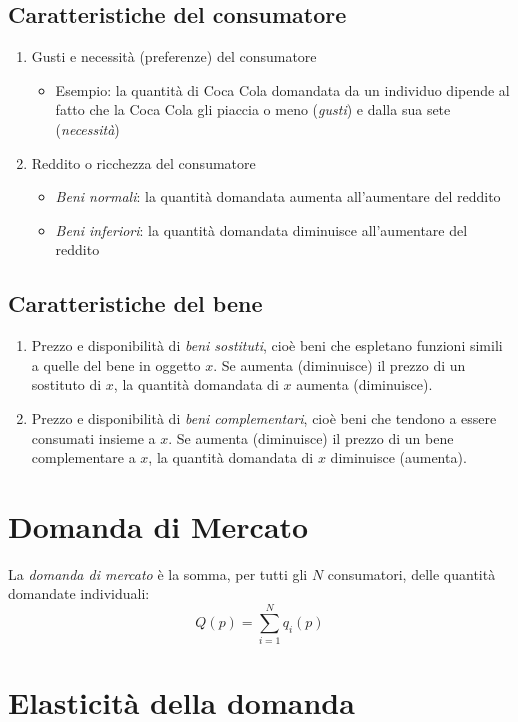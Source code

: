 \subsection{Caratteristiche del consumatore}
\begin{enumerate}
	\item Gusti e necessità (preferenze) del consumatore
	\begin{itemize}
		\item Esempio: la quantità di Coca Cola domandata da un individuo dipende al fatto che la Coca Cola gli piaccia o meno (\emph{gusti}) e dalla sua sete (\emph{necessità})
	\end{itemize}
	\item Reddito o ricchezza del consumatore
	\begin{itemize}
		\item \emph{Beni normali}: la quantità domandata aumenta all’aumentare del reddito
		\item \emph{Beni inferiori}: la quantità domandata diminuisce all’aumentare del reddito
	\end{itemize}
\end{enumerate}

\subsection{Caratteristiche del bene}
\begin{enumerate}
	\item Prezzo e disponibilità di \emph{beni sostituti}, cioè beni che espletano funzioni simili a quelle del bene in oggetto $x$. Se aumenta (diminuisce) il prezzo di un sostituto di $x$, la quantità domandata di $x$ aumenta
	(diminuisce).
	\item Prezzo e disponibilità di \emph{beni complementari}, cioè beni che tendono a essere consumati insieme a $x$. Se aumenta (diminuisce) il prezzo di un bene complementare a $x$, la quantità domandata di $x$
	diminuisce (aumenta).
\end{enumerate}

\section{Domanda di Mercato}
La \emph{domanda di mercato} è la somma, per tutti gli $N$ consumatori, delle quantità
domandate individuali:
\[
Q(p) = \sum^N_{i=1} q_i(p)
\]

\section{Elasticità della domanda} 

